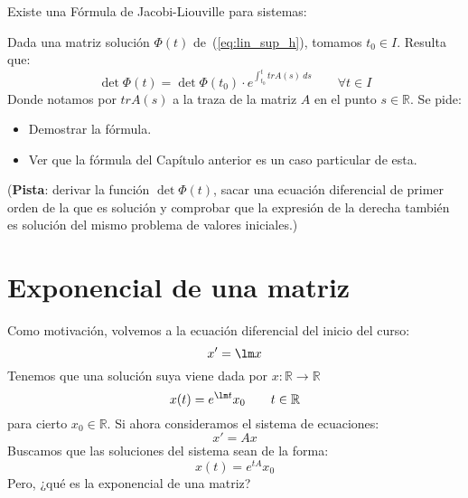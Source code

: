 \begin{ejercicio*}
    Existe una Fórmula de Jacobi-Liouville para sistemas:

    Dada una matriz solución $\Phi(t)$ de~(\ref{eq:lin_sup_h}), tomamos $t_0\in I$. Resulta que:
    \begin{equation*}
        \det\Phi(t) = \det\Phi(t_0)\cdot e^{\displaystyle \int_{t_0}^{t} tr A(s)~ds } \qquad \forall t\in I
    \end{equation*}
    Donde notamos por $trA(s)$ a la traza de la matriz $A$ en el punto $s\in \mathbb{R}$. Se pide:
    \begin{itemize}
        \item Demostrar la fórmula.
        \item Ver que la fórmula del Capítulo anterior es un caso particular de esta.
    \end{itemize}
    (\textbf{Pista}: derivar la función $\det\Phi(t)$, sacar una ecuación diferencial de primer orden de la que es solución y comprobar que la expresión de la derecha también es solución del mismo problema de valores iniciales.)
\end{ejercicio*}

\section{Exponencial de una matriz}
\noindent
Como motivación, volvemos a la ecuación diferencial del inicio del curso:
\begin{equation*}
    x' = \lm x
\end{equation*}
Tenemos que una solución suya viene dada por $x:\mathbb{R}\rightarrow\mathbb{R}$
\begin{equation*}
    x(t) = e^{\lm t} x_0 \qquad t\in \mathbb{R}
\end{equation*}
para cierto $x_0\in \mathbb{R}$. Si ahora consideramos el sistema de ecuaciones:
\begin{equation*}
    x' = Ax
\end{equation*}
Buscamos que las soluciones del sistema sean de la forma:
\begin{equation*}
    x(t) = e^{tA} x_0
\end{equation*}
Pero, ¿qué es la exponencial de una matriz?

